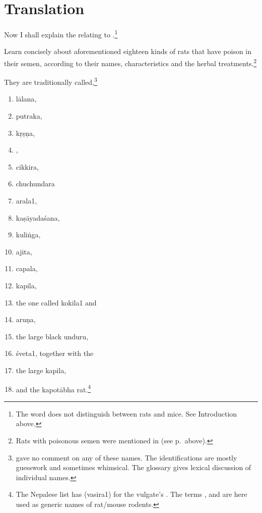 \section{Translation}

\begin{translation}
    
    \item[1] 
    
Now I shall explain the  relating to 
.\footnote{The word  does not distinguish 
between rats and mice.  See Introduction above.}
    
    \item[3] 
    
    Learn concisely about aforementioned eighteen kinds of rats that have 
    poison in their semen, according to their names, characteristics and the 
    herbal treatments.\footnote{Rats with poisonous semen were mentioned 
    in  (see p.\,\pageref{sukravisa} above).}
    

    \item[4--6]
    
    They are traditionally called,\footnote{ gave no 
    comment on any of these names.  The identifications are 
    mostly guesswork and sometimes whimsical.  The glossary gives lexical 
    discussion of individual names.}
    \begin{enumerate}
        \item \Gls{lālana},
        \item \Gls{putraka},
        \item \Gls{kṛṣṇa},
        \item {},
        \item \Gls{cikkira}, %
        \item \Gls{chuchundara} %
        \item \Gls{arala1}, %
        \item \Gls{kaṣāyadaśana},
        \item \Gls{kuliṅga},
        \item \Gls{ajita},
        \item \Gls{capala},
        \item \Gls{kapila},
        \item the one called \Gls{kokila1} and 
        \item \Gls{aruṇa},
        \item the large black \Gls{unduru}, 
        \item \Gls{śveta1}, together with the
        \item the large \Gls{kapila},
        \item and the \Gls{kapotābha} rat.\footnote{The Nepalese list has 
         (\Gls{vasira1}) for the 
        vulgate's .  The terms ,  and 
         are here used as generic names of rat/mouse rodents.}
\end{enumerate}
    

\end{translation}
